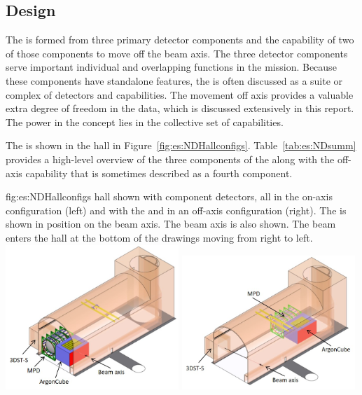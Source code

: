 \subsection{Design}
\label{sec:exsum-nd-BriefOverview-design}


The   is formed from three primary detector components and the capability of two of those components to move off the beam axis. The three detector components serve important individual and overlapping functions in the  mission.  Because these components have standalone features, the   is often discussed as a suite or complex of detectors and capabilities.  The movement off axis provides a valuable extra degree of freedom in the data, which is discussed extensively in this report.  The power in the   concept lies in the collective set of capabilities.  

The   is shown in the   hall in Figure~\ref{fig:es:NDHallconfigs}.  Table~\ref{tab:es:NDsumm} provides a high-level overview of the three components of the   along with the off-axis capability that is sometimes described as a fourth component.  

\begin{dunefigure}{fig:es:NDHallconfigs}
{  hall shown with component detectors, all in the on-axis configuration (left) and with the  and  in an off-axis configuration (right). The  is shown in position on the beam axis. The beam axis is also shown.  The beam enters the hall at the bottom of the drawings moving from right to left.}
\includegraphics[width=0.49\textwidth]{graphics/NDHall_onaxis.jpg}
\includegraphics[width=0.49\textwidth]{graphics/NDHall_offaxis.jpg}
\end{dunefigure}



